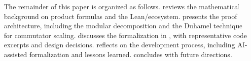The remainder of this paper is organized as follows.
 reviews the mathematical background on product formulas
and the Lean/\Mathlib ecosystem.
 presents the proof architecture, including the modular
decomposition and the Duhamel technique for commutator scaling.
 discusses the formalization in \Lean, with
representative code excerpts and design decisions.
 reflects on the development process, including
AI-assisted formalization and lessons learned.
 concludes with future directions.
